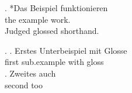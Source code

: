 

\exg. *Das Beispiel funktionieren \\
      the example work. \\
\glt Judged glossed shorthand.

\ex.
\ag. Erstes Unterbeispiel mit Glosse \\
     first sub.example with gloss \\
\bg. Zweites auch \\
     second too \\


